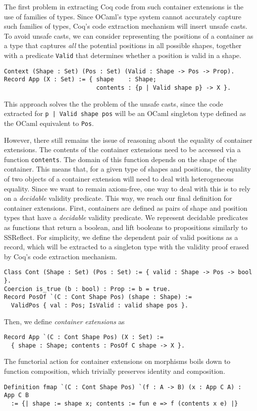 \documentclass[a4paper, UKenglish, cleveref, autoref, thm-restate]{lipics-v2021}
\begin{document}
The first problem in extracting Coq code from such container extensions is the
use of families of types. Since OCaml's type system cannot accurately capture
such families of types, Coq's code extraction mechanism will insert unsafe
casts. To avoid unsafe casts, we can consider representing the positions of a
container as a type that captures \emph{all} the potential positions in all
possible shapes, together with a predicate \texttt{Valid} that
determines whether a position is valid in a shape.
\begin{verbatim}
Context (Shape : Set) (Pos : Set) (Valid : Shape -> Pos -> Prop).
Record App (X : Set) := { shape    : Shape; 
                          contents : {p | Valid shape p} -> X }.
\end{verbatim}
This approach solves the the problem of the unsafe casts, since the code
extracted for \texttt{{p | Valid shape pos}} will be an OCaml singleton
type defined as the OCaml equivalent to \texttt{Pos}.

However, there still remains the issue of reasoning about the equality of
container extensions. The contents of the container extensions need to be
accessed via a function \texttt{contents}. The domain of this function
depends on the shape of the container. This means that, for a given type of
shapes and positions, the equality of two objects of a container extension will
need to deal with heterogeneous equality. Since we want to remain axiom-free,
one way to deal with this is to rely on a \emph{decidable} validity predicate.
This way, we reach our final definition for container extensions. First,
containers are defined as pairs of shape and position types that have a
\emph{decidable} validity predicate. We represent decidable predicates as
functions that return a boolean, and lift booleans to propositions similarly to
SSReflect. For simplicity, we define the dependent pair of valid positions as a
record, which will be extracted to a singleton type with the validity proof
erased by Coq's code extraction mechanism.
\begin{verbatim}
Class Cont (Shape : Set) (Pos : Set) := { valid : Shape -> Pos -> bool }.
Coercion is_true (b : bool) : Prop := b = true.
Record PosOf `(C : Cont Shape Pos) (shape : Shape) := 
  ValidPos { val : Pos; IsValid : valid shape pos }.
\end{verbatim}
Then, we define \emph{container extensions} as
\begin{verbatim}
Record App `(C : Cont Shape Pos) (X : Set) :=
  { shape : Shape; contents : PosOf C shape -> X }.
\end{verbatim}
The functorial action for container extensions on morphisms boils down to
function composition, which trivially preserves identity and composition.
\begin{verbatim}
Definition fmap `(C : Cont Shape Pos) `(f : A -> B) (x : App C A) : App C B
  := {| shape := shape x; contents := fun e => f (contents x e) |}
\end{verbatim}
\end{document}
